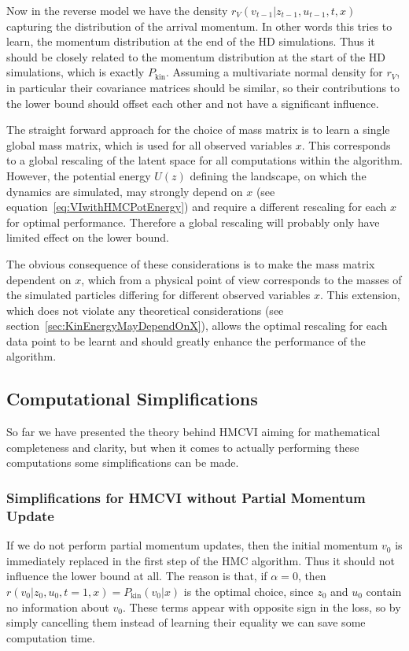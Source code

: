 Now in the reverse model we have the density $r_V(v_{t-1}|z_{t-1}, u_{t-1}, t, x)$ capturing the distribution of the arrival momentum. In other words this tries to learn, the momentum distribution at the end of the HD simulations. Thus it should be closely related to the momentum distribution at the start of the HD simulations, which is exactly $P_\textrm{kin}$. Assuming a multivariate normal density for $r_V$, in particular their covariance matrices should be similar, so their contributions to the lower bound should offset each other and not have a significant influence.

The straight forward approach for the choice of mass matrix is to learn a single global mass matrix, which is used for all observed variables $x$. This corresponds to a global rescaling of the latent space for all computations within the algorithm. However, the potential energy $U(z)$ defining the landscape, on which the dynamics are simulated, may strongly depend on $x$ (see equation~\eqref{eq:VIwithHMCPotEnergy}) and require a different rescaling for each $x$ for optimal performance. Therefore a global rescaling will probably only have limited effect on the lower bound.

The obvious consequence of these considerations is to make the mass matrix dependent on $x$, which from a physical point of view corresponds to the masses of the simulated particles differing for different observed variables $x$. This extension, which does not violate any theoretical considerations (see section~\ref{sec:KinEnergyMayDependOnX}), allows the optimal rescaling for each data point to be learnt and should greatly enhance the performance of the algorithm.

\subsection{Computational Simplifications}

So far we have presented the theory behind HMCVI aiming for mathematical completeness and clarity, but when it comes to actually performing these computations some simplifications can be made.

\subsubsection{Simplifications for HMCVI without Partial Momentum Update}
\label{sec:SimplificationWithoutPartialMomentumUpdate}
If we do not perform partial momentum updates, then the initial momentum $v_0$ is immediately replaced in the first step of the HMC algorithm. Thus it should not influence the lower bound at all. The reason is that, if $\alpha = 0$, then $r(v_0|z_0, u_0, t=1, x) = P_\textrm{kin}(v_0|x)$ is the optimal choice, since $z_0$ and $u_0$ contain no information about $v_0$. These terms appear with opposite sign in the loss, so by simply cancelling them instead of learning their equality we can save some computation time.

